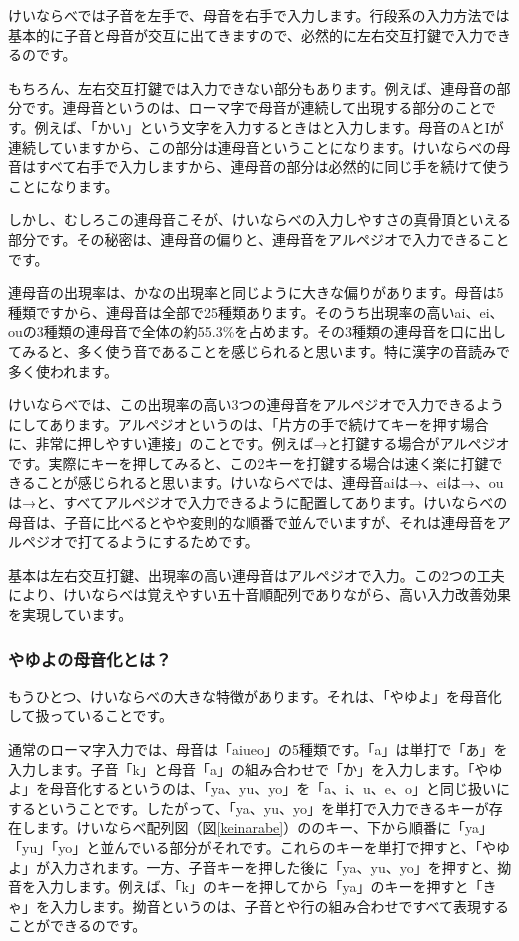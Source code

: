 けいならべでは子音を左手で、母音を右手で入力します。行段系の入力方法では基本的に子音と母音が交互に出てきますので、必然的に左右交互打鍵で入力できるのです。

もちろん、左右交互打鍵では入力できない部分もあります。例えば、連母音の部分です。連母音というのは、ローマ字で母音が連続して出現する部分のことです。例えば、「かい」という文字を入力するときはと入力します。母音のAとIが連続していますから、この部分は連母音ということになります。けいならべの母音はすべて右手で入力しますから、連母音の部分は必然的に同じ手を続けて使うことになります。

しかし、むしろこの連母音こそが、けいならべの入力しやすさの真骨頂といえる部分です。その秘密は、連母音の偏りと、連母音をアルペジオで入力できることです。

連母音の出現率は、かなの出現率と同じように大きな偏りがあります。母音は5種類ですから、連母音は全部で25種類あります。そのうち出現率の高いai、ei、ouの3種類の連母音で全体の約55.3\%を占めます。その3種類の連母音を口に出してみると、多く使う音であることを感じられると思います。特に漢字の音読みで多く使われます。

けいならべでは、この出現率の高い3つの連母音をアルペジオで入力できるようにしてあります。アルペジオというのは、「片方の手で続けてキーを押す場合に、非常に押しやすい連接」のことです。例えば→と打鍵する場合がアルペジオです。実際にキーを押してみると、この2キーを打鍵する場合は速く楽に打鍵できることが感じられると思います。けいならべでは、連母音aiは→、eiは→、ouは→と、すべてアルペジオで入力できるように配置してあります。けいならべの母音は、子音に比べるとやや変則的な順番で並んでいますが、それは連母音をアルペジオで打てるようにするためです。

基本は左右交互打鍵、出現率の高い連母音はアルペジオで入力。この2つの工夫により、けいならべは覚えやすい五十音順配列でありながら、高い入力改善効果を実現しています。

\subsubsection*{やゆよの母音化とは？}

もうひとつ、けいならべの大きな特徴があります。それは、「やゆよ」を母音化して扱っていることです。

通常のローマ字入力では、母音は「aiueo」の5種類です。「a」は単打で「あ」を入力します。子音「k」と母音「a」の組み合わせで「か」を入力します。「やゆよ」を母音化するというのは、「ya、yu、yo」を「a、i、u、e、o」と同じ扱いにするということです。したがって、「ya、yu、yo」を単打で入力できるキーが存在します。けいならべ配列図（図\ref{keinarabe}）ののキー、下から順番に「ya」「yu」「yo」と並んでいる部分がそれです。これらのキーを単打で押すと、「やゆよ」が入力されます。一方、子音キーを押した後に「ya、yu、yo」を押すと、拗音を入力します。例えば、「k」のキーを押してから「ya」のキーを押すと「きゃ」を入力します。拗音というのは、子音とや行の組み合わせですべて表現することができるのです。


